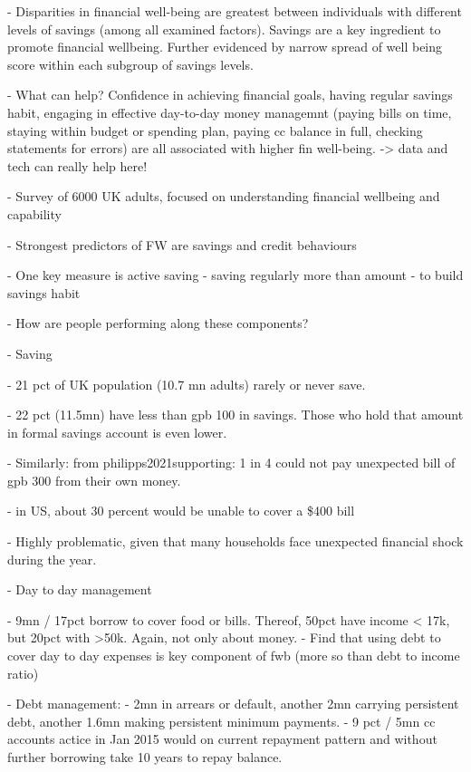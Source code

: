 - Disparities in financial well-being are greatest between individuals with
different levels of savings (among all examined factors). Savings are a key
ingredient to promote financial wellbeing. Further evidenced by narrow spread
of well being score within each subgroup of savings levels. 

- What can help? Confidence in achieving financial goals, having regular
savings habit, engaging in effective day-to-day money managemnt (paying bills
on time, staying within budget or spending plan, paying cc balance in full,
checking statements for errors) are all associated with higher fin well-being.
-> data and tech can really help here!

\citet{mps2018building}

- Survey of 6000 UK adults, focused on understanding financial wellbeing and
capability

- Strongest predictors of FW are savings and credit behaviours

- One key measure is active saving - saving regularly more than amount - to
build savings habit




- How are people performing along these components?

- Saving

\citet{mps2018building}

- 21 pct of UK population (10.7 mn adults) rarely or never save.

- 22 pct (11.5mn) have less than gpb 100 in savings. Those who hold that amount
in formal savings account is even lower.

- Similarly: from philipps2021supporting: 1 in 4 could not pay unexpected bill
of gpb 300 from their own money.

- in US, about 30 percent would be unable to cover a \$400 bill
\citep{fed2022economic}

- Highly problematic, given that many households face unexpected financial
shock during the year.


- Day to day management

\citet{mps2018building}
- 9mn / 17pct borrow to cover food or bills. Thereof, 50pct have income < 17k,
but 20pct with >50k. Again, not only about money.
- Find that using debt to cover day to day expenses is key component of fwb
(more so than debt to income ratio)


- Debt management:
\citet{fca2016credit}
- 2mn in arrears or default, another 2mn carrying persistent debt, another
1.6mn making persistent minimum payments.
- 9 pct / 5mn cc accounts actice in Jan 2015 would on current repayment pattern
and without further borrowing take 10 years to repay balance.


